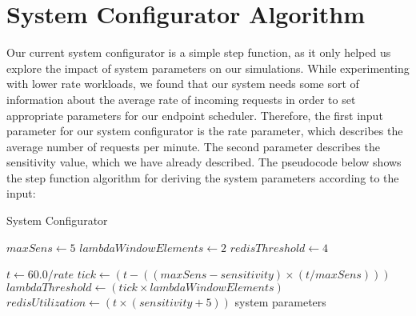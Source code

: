 \section{System Configurator Algorithm}
\label{sec:system_configurator_algorithm}
Our current system configurator is a simple step function, as it only helped us explore the impact of system parameters on our simulations. While experimenting with lower rate workloads, we found that our system needs some sort of information about the average rate of incoming requests in order to set appropriate parameters for our endpoint scheduler. Therefore, the first input parameter for our system configurator is the rate parameter, which describes the average number of requests per minute. The second parameter describes the sensitivity value, which we have already described. The pseudocode below shows the step function algorithm for deriving the system parameters according to the input:
\begin{algorithm}
    \caption{System Configurator}\label{alg:system_configurator}
    \begin{algorithmic}
            \State $maxSens \gets 5$
            \State $lambdaWindowElements \gets 2$
            \State $redisThreshold \gets 4$

            \State $t \gets 60.0/rate$ 
            \State $tick \gets (t - ((maxSens - sensitivity) \times (t / maxSens)))$ 
            \State $lambdaThreshold \gets (tick \times lambdaWindowElements)$ 
            \State $redisUtilization \gets (t \times (sensitivity+5))$ 
            \State \Return system parameters
        \EndProcedure
    \end{algorithmic}
\end{algorithm}

